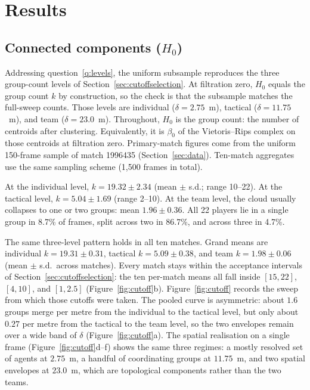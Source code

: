 \section{Results}

\subsection{Connected components (\texorpdfstring{$H_0$}{})}
\label{sec:scaleh0}

Addressing question~\ref{q:levels}, the uniform subsample reproduces
the three group-count levels of Section~\ref{sec:cutoffselection}.
At filtration zero, $H_0$ equals the group count $k$ by construction,
so the check is that the subsample matches the full-sweep counts.
Those levels are individual
($\delta = 2.75$~m), tactical ($\delta = 11.75$~m), and team
($\delta = 23.0$~m). Throughout, $H_0$ is the group count: the number
of centroids after clustering. Equivalently, it is $\beta_0$ of the
Vietoris--Rips complex on those centroids at filtration zero.
Primary-match figures come from the uniform 150-frame sample of match
1996435 (Section~\ref{sec:data}). Ten-match aggregates use the same
sampling scheme (1{,}500 frames in total).

At the individual level,
$k = 19.32 \pm 2.34$ (mean $\pm$ s.d.; range 10--22). At the tactical
level, $k = 5.04 \pm 1.69$ (range 2--10). At the
team level, the cloud usually collapses to one or
two groups: mean $1.96 \pm 0.36$. All 22 players lie in a single
group in 8.7\% of frames, split across two in 86.7\%, and across
three in 4.7\%.

The same three-level pattern holds in all ten matches. Grand means are
individual $k = 19.31 \pm 0.31$, tactical $k = 5.09 \pm 0.38$, and
team $k = 1.98 \pm 0.06$ (mean $\pm$ s.d.\ across matches).
Every match stays within the acceptance intervals of
Section~\ref{sec:cutoffselection}: the ten per-match means all fall
inside $[15,22]$, $[4,10]$, and $[1,2.5]$
(Figure~\ref{fig:cutoff}b). Figure~\ref{fig:cutoff} records the sweep
from which those cutoffs were taken. The pooled curve is asymmetric:
about $1.6$ groups merge per metre from the individual to the
tactical level, but only about $0.27$ per metre from the tactical to
the team level, so the two envelopes remain over a wide band
of $\delta$ (Figure~\ref{fig:cutoff}a). The spatial realisation on a
single frame (Figure~\ref{fig:cutoff}d--f) shows the same three
regimes: a mostly resolved set of agents at $2.75$~m, a handful of
coordinating groups at $11.75$~m, and two spatial envelopes at
$23.0$~m, which are topological components rather than the two teams.

